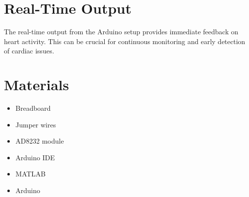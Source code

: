 \documentclass[12pt]{article}
\begin{document}
\section{Real-Time Output}
The real-time output from the Arduino setup provides immediate feedback on heart activity. This can be crucial for continuous monitoring and early detection of cardiac issues.

\section{Materials}
\begin{itemize}
    \item Breadboard
    \item Jumper wires
    \item AD8232 module
    \item Arduino IDE
    \item MATLAB
    \item Arduino
\end{itemize}
\end{document}
